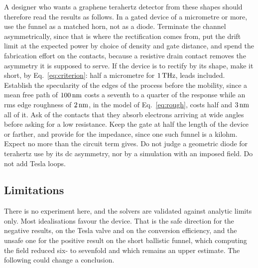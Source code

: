 A designer who wants a graphene terahertz detector from these shapes
should therefore read the results as follows. In a gated device of a
micrometre or more, use the funnel as a matched horn, not as a diode.
Terminate the
channel asymmetrically, since that is where the rectification comes from,
put the drift limit at the expected power by choice of density and
gate distance, and spend the fabrication effort on the contacts, because a
resistive drain contact removes the asymmetry it is supposed to serve. If
the device is to rectify by its shape, make it short, by
Eq.~\eqref{eq:criterion}: half a micrometre for $1\,\mathrm{THz}$, leads included.
Establish the specularity of the edges of the process before the
mobility, since a mean free path
of $100\,\mathrm{nm}$ costs a seventh to a quarter of the response while an rms edge roughness
of $2\,\mathrm{nm}$, in the model of Eq.~\eqref{eq:rough}, costs half and $3\,\mathrm{nm}$
all of it. Ask of the contacts that they absorb
electrons arriving at wide angles before asking for a low resistance.
Keep the gate at half the length of the device or farther, and provide
for the impedance,
since one such funnel is a kilohm. Expect no more than the circuit term
gives. Do not judge a geometric diode for terahertz use by its dc
asymmetry, nor by a simulation with an imposed field. Do not add Tesla
loops.

\subsection{Limitations}

There is no experiment here, and the solvers are validated against
analytic limits only. Most idealisations favour the device. That is
the safe direction for the negative results, on the Tesla valve and on the
conversion efficiency, and the unsafe one for the positive result on the
short ballistic funnel, which computing the field reduced six- to
sevenfold and which remains an upper estimate. The following could change
a conclusion.

